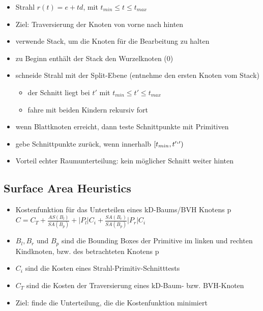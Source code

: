 \documentclass[paper=a4, fontsize=11pt]{scrartcl} %
\numberwithin{equation}{section} %
\numberwithin{figure}{section} %
\numberwithin{table}{section} %
\begin{document}
\begin{itemize}
\item Strahl $r(t) = e + td$, mit $t_{min} \le t \le t_{max}$
\item Ziel: Traversierung der Knoten von vorne nach hinten
\item verwende Stack, um die Knoten für die Bearbeitung zu halten
\item zu Beginn enthält der Stack den Wurzelknoten (0)
\item schneide Strahl mit der Split-Ebene (entnehme den ersten Knoten vom Stack)
\begin{itemize}
\item der Schnitt liegt bei $t'$ mit $t_{min} \le t' \le t_{max}$
\item fahre mit beiden Kindern rekursiv fort
\end{itemize}
\item wenn Blattknoten erreicht, dann teste Schnittpunkte mit Primitiven
\item gebe Schnittpunkte zurück, wenn innerhalb $[t_{min},t'`')$
\item Vorteil echter Raumunterteilung: kein möglicher Schnitt weiter hinten
\end{itemize}

\subsection{Surface Area Heuristics}

\begin{itemize}
\item Kostenfunktion für das Unterteilen eines kD-Baums/BVH Knotens p\\
$C = C_T + \frac{AS(B_l)}{SA(B_p)} + |P_l| C_i + \frac{SA(B_r)}{SA(B_p)} |P_r| C_i$
\item $B_l, B_r$ und $B_p$ sind die Bounding Boxes der Primitive im linken und rechten Kindknoten, bzw. des betrachteten Knotens p
\item $C_i$ sind die Kosten eines Strahl-Primitiv-Schnitttests
\item $C_T$ sind die Kosten der Traversierung eines kD-Baum- bzw. BVH-Knoten
\item Ziel: finde die Unterteilung, die die Kostenfunktion minimiert
\end{itemize}
\end{document}
